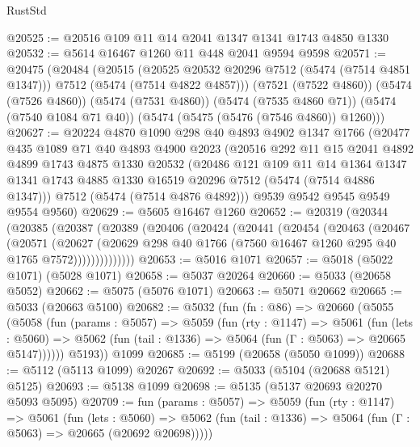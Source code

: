 \begin{lexlean}{RustStd}
\begin{coremodule}
@20525 := @20516 @109 @11 @14 @2041 @1347 @1341 @1743 @4850 @1330
@20532 := @5614 @16467 @1260 @11 @448 @2041 @9594 @9598
@20571 := @20475
    (@20484
      (@20515
        (@20525 @20532 @20296 @7512 (@5474 (@7514 @4851 @1347)))
        @7512
        (@5474 (@7514 @4822 @4857)))
      (@7521 (@7522 @4860))
      (@5474 (@7526 @4860))
      (@5474 (@7531 @4860))
      (@5474 (@7535 @4860 @71))
      (@5474 (@7540 @1084 @71 @40))
      (@5474 (@5475 (@5476 (@7546 @4860)) @1260)))
@20627 := @20224
    @4870
    @1090
    @298
    @40
    @4893
    @4902
    @1347
    @1766
    (@20477
      @435
      @1089
      @71
      @40
      @4893
      @4900
      @2023
      (@20516
        @292
        @11
        @15
        @2041
        @4892
        @4899
        @1743
        @4875
        @1330
        @20532
        (@20486
          @121
          @109
          @11
          @14
          @1364
          @1347
          @1341
          @1743
          @4885
          @1330
          @16519
          @20296
          @7512
          (@5474 (@7514 @4886 @1347)))
        @7512
        (@5474 (@7514 @4876 @4892)))
      @9539
      @9542
      @9545
      @9549
      @9554
      @9560)
@20629 := @5605 @16467 @1260
@20652 := @20319
    (@20344
      (@20385
        (@20387
          (@20389
            (@20406
              (@20424
                (@20441
                  (@20454
                    (@20463
                      (@20467
                        (@20571
                          (@20627
                            (@20629
                              @298
                              @40
                              @1766
                              (@7560 @16467 @1260 @295 @40 @1765 @7572))))))))))))))
@20653 := @5016 @1071
@20657 := @5018 (@5022 @1071) (@5028 @1071)
@20658 := @5037 @20264
@20660 := @5033 (@20658 @5052)
@20662 := @5075 (@5076 @1071)
@20663 := @5071 @20662
@20665 := @5033 (@20663 @5100)
@20682 := @5032
    (fun (fn : @86) =>
    @20660
      (@5055
        (@5058
          (fun (params : @5057) =>
          @5059
            (fun (rty : @1147) =>
            @5061
              (fun (lets : @5060) =>
              @5062 (fun (tail : @1336) => @5064 (fun (Γ : @5063) => @20665 @5147))))))
        @5193))
    @1099
@20685 := @5199 (@20658 (@5050 @1099))
@20688 := @5112 (@5113 @1099) @20267
@20692 := @5033 (@5104 (@20688 @5121) @5125)
@20693 := @5138 @1099
@20698 := @5135 (@5137 @20693 @20270 @5093 @5095)
@20709 := fun (params : @5057) =>
  @5059
    (fun (rty : @1147) =>
    @5061
      (fun (lets : @5060) =>
      @5062 (fun (tail : @1336) => @5064 (fun (Γ : @5063) => @20665 (@20692 @20698)))))

\end{coremodule}
\end{lexlean}
